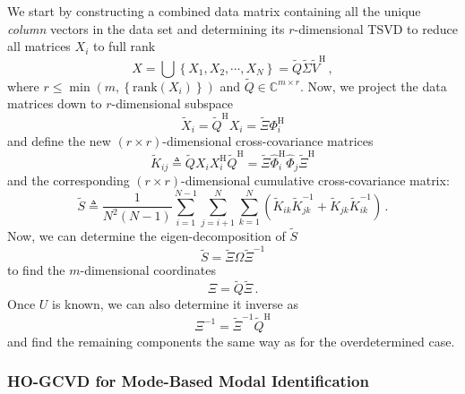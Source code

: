 \documentclass[10pt]{article}
\begin{document}
We start by constructing a combined data matrix containing all the unique {\em column} vectors in the data set and determining its $r$-dimensional TSVD to reduce all matrices $X_i$ to full rank 
\begin{equation}
    X = \bigcup \left\{X_1, X_2, \cdots, X_N\right\}
    = \tilde Q \tilde \Sigma \tilde V^\mathrm{H}\,,
\end{equation}
where $r \le \min\left(m, \left\{\mathrm{rank}(X_i)\right\}\right)$ and $\tilde Q\in\mathbb{C}^{m\times r}$.
Now, we project the data matrices down to $r$-dimensional subspace
\begin{equation}
    \tilde X_i = \tilde Q^\mathrm{H} X_i = \tilde \Xi \Phi_i^\mathrm{H}
\end{equation}
and define the new $(r\times r)$-dimensional cross-covariance matrices
\begin{equation}
    \tilde K_{ij} \triangleq \tilde Q X_i X_i^\mathrm{H}\tilde Q^\mathrm{H} = \tilde \Xi \hat \Phi_i^\mathrm{H}\hat \Phi_j \tilde \Xi^\mathrm{H}
\end{equation}
and the corresponding $(r\times r)$-dimensional cumulative cross-covariance matrix:
\begin{equation}
    \tilde S \triangleq \frac{1}{N^2(N-1)}\sum_{i=1}^{N-1} \sum_{j=i+1}^N \sum_{k=1}^N \left(\tilde K_{ik} \tilde K_{jk}^{-1} +\tilde K_{jk} \tilde K_{ik}^{-1}\right)\,.
\end{equation}
Now, we can determine the eigen-decomposition of $\tilde S$
\begin{equation}
    \tilde S = \tilde \Xi \Omega \tilde \Xi^{-1}
\end{equation}
to find the $m$-dimensional coordinates
\begin{equation}
    \Xi = \tilde Q \tilde \Xi\,.
\end{equation}
Once $U$ is known, we can also determine it inverse as
\begin{equation}
    \Xi^{-1}=\tilde \Xi^{-1}\tilde Q^\mathrm{H}
\end{equation}
and find the remaining components the same way as for the overdetermined case.

\subsubsection{HO-GCVD for Mode-Based Modal Identification}
\end{document}
